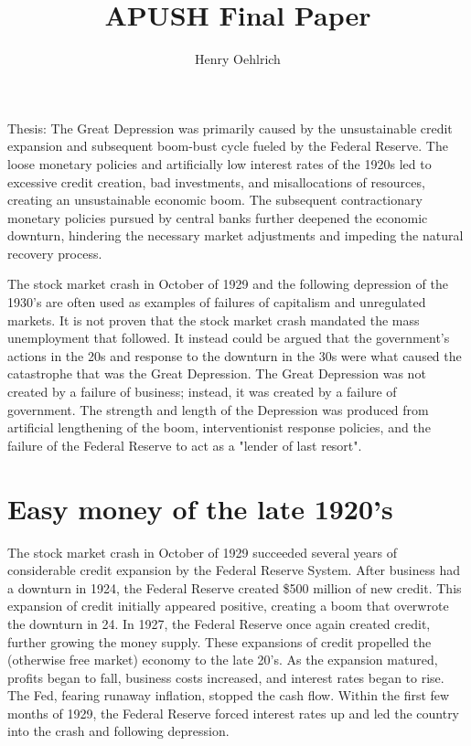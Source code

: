 \documentclass{article}
\title{APUSH Final Paper}
\author{Henry Oehlrich}
\begin{document}
\maketitle{}

Thesis: The Great Depression was primarily caused by the unsustainable credit
expansion and subsequent boom-bust cycle fueled by the Federal Reserve. The
loose monetary policies and artificially low interest rates of the 1920s led to
excessive credit creation, bad investments, and misallocations of resources,
creating an unsustainable economic boom. The subsequent contractionary monetary
policies pursued by central banks further deepened the economic downturn,
hindering the necessary market adjustments and impeding the natural recovery
process. 

The stock market crash in October of 1929 and the following depression of the
1930's are often used as examples of failures of capitalism and unregulated
markets. It is not proven that the stock market crash mandated the mass
unemployment that followed. It instead could be argued that the government's
actions in the 20s and response to the downturn in the 30s were what caused the
catastrophe that was the Great Depression. The Great Depression was not created
by a failure of business; instead, it was created by a failure of government.
The strength and length of the Depression was produced from artificial
lengthening of the boom, interventionist response policies, and the failure of
the Federal Reserve to act as a "lender of last resort".

\section{Easy money of the late 1920's}


The stock market crash in October of 1929 succeeded several years of
considerable credit expansion by the Federal Reserve System. After business had
a downturn in 1924, the Federal Reserve created \$500 million of new credit.
This expansion of credit initially appeared positive, creating a boom that
overwrote the downturn in 24. In 1927, the Federal Reserve once again created
credit, further growing the money supply. These expansions of credit propelled
the (otherwise free market) economy to the late 20's. As the expansion matured,
profits began to fall, business costs increased, and interest rates began to
rise. The Fed, fearing runaway inflation, stopped the cash flow. Within the
first few months of 1929, the Federal Reserve forced interest rates up and led
the country into the crash and following depression.
\end{document}
